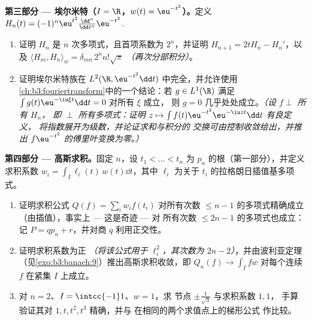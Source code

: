 \begin{problem}
\medskip
\noindent\textbf{第三部分 --- 埃尔米特（$I = \R$，$w(t) =
\eu^{-t^2}$）。}定义 $H_n(t) =
(-1)^n\eu^{t^2}\frac{\dd^n}{\dd t^n}\eu^{-t^2}$.
\begin{enumerate}[resume]
  \item 证明 $H_n$ 是 $n$ 次多项式，且首项系数为
        $2^n$，并证明 $H_{n+1} = 2tH_n -
        H_n'$，以及 $\langle H_m, H_n\rangle_w =
        \delta_{mn}\,2^nn!\sqrt\pi$ \emph{（再次分部积分）}。
  \item 证明埃尔米特族在 $L^2(\R,
        \eu^{-t^2}\dd t)$ 中完全，并允许使用
        \cref{ch:b3:fouriertransform}中的一个结论：若 $g \in L^1(\R)$ 满足
        $\int g(t)\eu^{-\iu\xi t}\dd t = 0$ 对所有 $\xi$ 成立，
        则 $g = 0$ 几乎处处成立。\emph{（设 $f \perp$ 所有 $H_n$，
        即 $\perp$ 所有多项式：证明 $z \mapsto \int
        f(t)\eu^{-t^2}\eu^{-\iu zt}\dd t$ 有良定义，
        将指数展开为级数，并论证求和与积分的
        交换可由控制收敛给出，并推出
        $f\eu^{-t^2}$ 的傅里叶变换为零。）}
\end{enumerate}

\medskip
\noindent\textbf{第四部分 --- 高斯求积。}固定 $n$，设
$t_1 < \dots < t_n$ 为 $p_n$ 的根（第一部分），并定义
求积系数 $w_i = \int_I \ell_i(t)\,w(t)\dd t$，其中
$\ell_i$ 为关于
$t_i$ 的拉格朗日插值基多项式。
\begin{enumerate}[resume]
  \item 证明求积公式 $Q(f) = \sum_iw_if(t_i)$
        对所有次数 $\leq n - 1$ 的多项式精确成立
        （由插值），事实上 --- 这是奇迹 --- 对
        所有次数 $\leq 2n - 1$ 的多项式也成立：记 $P =
        qp_n + r$，并对商 $q$ 利用正交性。
  \item 证明求积系数为正
        \emph{（将该公式用于 $\ell_i^2$，其次数为 $2n -
        2$）}，并由波利亚定理
        （见\cref{exo:b3:banach:9}）推出高斯求积收敛，即
        $Q_n(f) \to \int_I fw$ 对每个连续
        $f$ 在紧集 $I$ 上成立。
  \item 对 $n = 2$、$I = \intcc{-1}1$、$w = 1$，求
        节点 $\pm\frac1{\sqrt3}$ 与求积系数 $1, 1$，
        手算验证其对 $1, t, t^2, t^3$ 精确，并与
        在相同的两个求值点上的梯形公式
        作比较。
\end{enumerate}


\end{problem}
